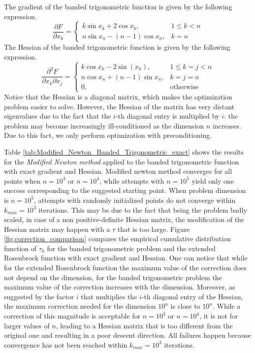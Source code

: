 The gradient of the banded trigonometric function is given by the following expression.
\begin{equation}
\frac{\partial F}{\partial x_k} = \left \{ \begin{array}{ll}
k\sin x_k + 2\cos x_k, & 1 \leq k < n \\
n\sin x_n - (n-1)\cos x_n, & k = n
\end{array} \right .
\end{equation}
The Hessian of the banded trigonometric function is given by the following expression.
\begin{equation}
\frac{\partial^2 F}{\partial x_k \partial x_j} = \left \{ \begin{array}{ll}
    k\cos x_k - 2\sin(x_k), & 1\leq k = j < n \\
    n\cos x_n + (n-1)\sin x_n, & k = j = n \\
    0, & \text{otherwise}
\end{array} \right .
\end{equation}
Notice that the Hessian is a diagonal matrix, which makes the optimization problem easier to solve.
However, the Hessian of the matrix has very distant eigenvalues due to the fact that the $i$-th diagonal entry is multiplied by $i$: the problem may become increasingly ill-conditioned as the dimension $n$ increases.
Due to this fact, we only perform optimization with preconditioning.

Table \ref{tab:Modified_Newton_Banded_Trigonometric_exact} shows the results for the \textit{Modified Newton method} applied to the banded trigonometric function with exact gradient and Hessian.
Modified newton method converges for all points when $n=10^3$ or $n=10^4$, while attempts with $n=10^5$ yield only one success corresponding to the suggested starting point.
When problem dimension is $n=10^5$, attempts with randomly initialized points do not converge within $k_{\textit{max}} = 10^3$ iterations.
This may be due to the fact that being the problem badly scaled, in case of a non positive-definite Hessian matrix, the modification of the Hessian matrix may happen with a $\tau$ that is too large.
Figure \ref{fig:correction_comparison} compares the empirical cumulative distribution function of $\tau_k$ for the banded trigonometric problem and the extended Rosenbrock function with exact gradient and Hessian.
One can notice that while for the extended Rosenbrock function the maximum value of the correction does not depend on the dimension, for the banded trigonometric problem the maximum value of the correction increases with the dimension.
Moreover, as suggested by the factor $i$ that multiplies the $i$-th diagonal entry of the Hessian, the maximum correction needed for the dimension $10^n$ is close to $10^n$.
While a correction of this magnitude is acceptable for $n=10^3$ or $n=10^4$, it is not for larger values of $n$, leading to a Hessian matrix that is too different from the original one and resulting in a poor descent direction.
All failures happen because convergence has not been reached within $k_{\textit{max}} = 10^3$ iterations.

